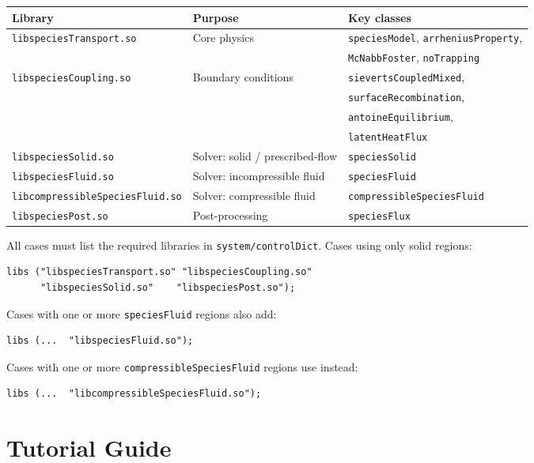 \documentclass[11pt,a4paper]{article}
\begin{document}
\begin{center}
\small
\begin{tabular}{lll}
\toprule
Library & Purpose & Key classes \\
\midrule
\texttt{libspeciesTransport.so} & Core physics & \texttt{speciesModel}, \texttt{arrheniusProperty},\\
& & \texttt{McNabbFoster}, \texttt{noTrapping} \\
\texttt{libspeciesCoupling.so} & Boundary conditions & \texttt{sievertsCoupledMixed},\\
& & \texttt{surfaceRecombination},\\
& & \texttt{antoineEquilibrium},\\
& & \texttt{latentHeatFlux} \\
\texttt{libspeciesSolid.so} & Solver: solid / prescribed-flow & \texttt{speciesSolid} \\
\texttt{libspeciesFluid.so} & Solver: incompressible fluid & \texttt{speciesFluid} \\
\texttt{libcompressibleSpeciesFluid.so} & Solver: compressible fluid & \texttt{compressibleSpeciesFluid} \\
\texttt{libspeciesPost.so} & Post-processing & \texttt{speciesFlux} \\
\bottomrule
\end{tabular}
\end{center}

All cases must list the required libraries in \texttt{system/controlDict}.
Cases using only solid regions:
\begin{verbatim}
libs ("libspeciesTransport.so" "libspeciesCoupling.so"
      "libspeciesSolid.so"    "libspeciesPost.so");
\end{verbatim}
Cases with one or more \texttt{speciesFluid} regions also add:
\begin{verbatim}
libs (...  "libspeciesFluid.so");
\end{verbatim}
Cases with one or more \texttt{compressibleSpeciesFluid} regions use instead:
\begin{verbatim}
libs (...  "libcompressibleSpeciesFluid.so");
\end{verbatim}

\section{Tutorial Guide}
\label{sec:tutorials}
\end{document}
